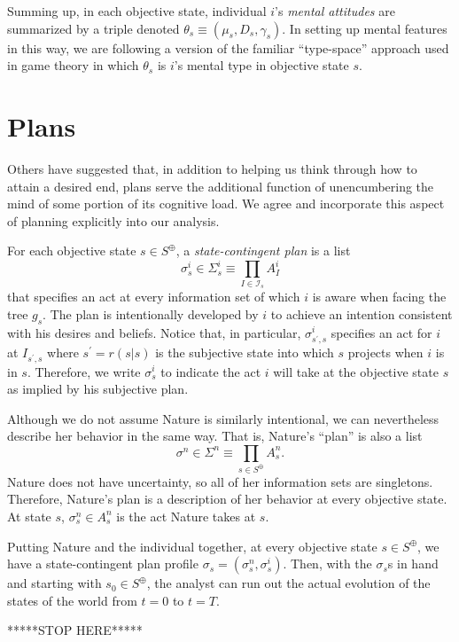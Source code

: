 \documentclass[
11pt,
titlepage,
reqno,
]{article}%
\theoremstyle{definition}
\begin{document}
Summing up, in each objective state, individual $i$'s \textit{mental attitudes} are summarized by a triple denoted $\theta_s\equiv(\mu_s,D_s,\gamma_s)$.
In setting up mental features in this way, we are following a version of the familiar ``type-space'' approach used in game theory \citep[See][]{Harsanyi1967, Mertens1985a} in which $\theta_s$ is $i$'s mental type in objective state $s$. 
	
	
	
\section{Plans}
Others have suggested that, in addition to helping us think through how to attain a desired end, plans serve the additional function of unencumbering the mind of some portion of its cognitive load. 
We agree and incorporate this aspect of planning explicitly into our analysis.

For each objective state $s\in S^\oplus$, a \textit{state-contingent plan} is a list 
\[
	\sigma^i_s\in\Sigma^i_s\equiv \prod_{I\in \mathcal{I}_s}A^i_{I}
\]
that specifies an act at every information set of which $i$ is aware when facing the tree $g_s$.
The plan is intentionally developed by $i$ to achieve an intention consistent with his desires and beliefs.
Notice that, in particular, $\sigma^i_{s^\prime,s}$ specifies an act for $i$ at $I_{s^\prime,s}$ where $s^\prime=r(s|s)$ is the subjective state into which  $s$ projects when $i$ is in $s$.
Therefore,  we write $\sigma^i_s$ to indicate the act $i$ will take at the objective state $s$ as implied by his subjective plan.

Although we do not assume Nature is similarly intentional, we can nevertheless describe her behavior in the same way. 
That is, Nature's ``plan'' is also a list
\[
\sigma^n\in\Sigma^n\equiv \prod_{s\in S^\oplus}A^n_s.
\]
Nature does not have uncertainty, so all of her information sets are singletons.
Therefore, Nature's plan is a description of her behavior at every objective state.
At state $s$, $\sigma^n_s\in A^n_s$ is the act Nature takes at $s$.

Putting Nature and the individual together, at every objective state $s\in S^\oplus$, we have a state-contingent plan profile $\sigma_s=(\sigma^n_s,\sigma^i_s)$.
Then, with the $\sigma_s$s in hand and starting with $s_0\in S^\oplus$, the analyst can run out the actual evolution of the states of the world from $t=0$ to $t=T$. 

*****STOP HERE*****
	
\end{document}
